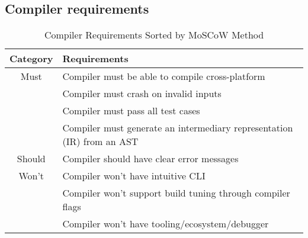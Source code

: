 \subsection{Compiler requirements} %

\begin{table}[ht]
\centering
\begin{tabular}{|c|l|}
\hline
\rowcolor{gray!50}
\textbf{Category} & \textbf{Requirements} \\
\hline
Must & Compiler must be able to compile cross-platform \\
     & Compiler must crash on invalid inputs \\
     & Compiler must pass all test cases \\
     & Compiler must generate an intermediary representation (IR) from an AST \\
\hline
Should & Compiler should have clear error messages \\
\hline
Won't & Compiler won't have intuitive CLI \\
      & Compiler won't support build tuning through compiler flags \\
      & Compiler won't have tooling/ecosystem/debugger \\
\hline
\end{tabular}
\caption{Compiler Requirements Sorted by MoSCoW Method}
\end{table}

\newpage
